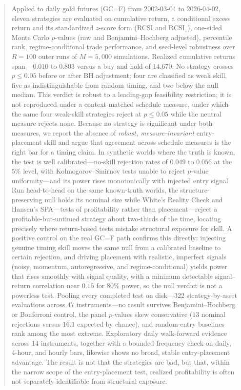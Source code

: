 \documentclass[preprint,12pt]{elsarticle}
\theoremstyle{definition}
\begin{document}
\begin{frontmatter}
\begin{abstract}
\par\smallskip\noindent
Applied to daily gold futures (GC=F) from 2002-03-04 to 2026-04-02, eleven strategies are evaluated on cumulative return, a conditional excess return and its standardized $z$-score form (RCSI and $\mathrm{RCSI}_z$), one-sided Monte Carlo $p$-values (raw and Benjamini--Hochberg adjusted), percentile rank, regime-conditional trade performance, and seed-level robustness over $R=100$ outer runs of $M=5{,}000$ simulations. Realized cumulative returns span $-0.010$ to $0.803$ versus a buy-and-hold of $14.670$. No strategy crosses $p\le 0.05$ before or after BH adjustment; four are classified as weak skill, five as indistinguishable from random timing, and two below the null median. This verdict is robust to a leading-gap feasibility restriction; it is not reproduced under a context-matched schedule measure, under which the same four weak-skill strategies reject at $p\le0.05$ while the neutral measure rejects none. Because no strategy is significant under both measures, we report the absence of \emph{robust, measure-invariant} entry-placement skill and argue that agreement across schedule measures is the right bar for a timing claim. In synthetic worlds where the truth is known, the test is well calibrated---no-skill rejection rates of $0.049$ to $0.056$ at the $5\%$ level, with Kolmogorov--Smirnov tests unable to reject $p$-value uniformity---and its power rises monotonically with injected entry signal. Run head-to-head on the same known-truth worlds, the structure-preserving null holds its nominal size while White's Reality Check and Hansen's SPA---tests of profitability rather than placement---reject a profitable-but-untimed strategy about two-thirds of the time, locating precisely where return-based tests mistake structural exposure for skill. A positive control on the real GC=F path confirms this directly: injecting genuine timing skill moves the same null from a calibrated baseline to certain rejection, and driving placement with realistic, imperfect signals (noisy, momentum, autoregressive, and regime-conditional) yields power that rises smoothly with signal quality, with a minimum detectable signal--return correlation near $0.15$ for $80\%$ power, so the null verdict is not a powerless test. Pooling every completed test on disk---$322$ strategy-by-asset evaluations across $47$ instruments---no result survives Benjamini--Hochberg or Bonferroni control, the panel $p$-values skew conservative ($13$ nominal rejections versus $16.1$ expected by chance), and random-entry baselines rank among the most extreme. Exploratory daily walk-forward evidence across 14 instruments, together with a bounded frequency check on daily, 4-hour, and hourly bars, likewise shows no broad, stable entry-placement advantage. The result is not that the strategies are bad, but that, within the narrow scope of the entry-placement test, realized profitability is often not separately identifiable from structural exposure.
\endgroup
\end{abstract}


\end{frontmatter}
\end{document}
